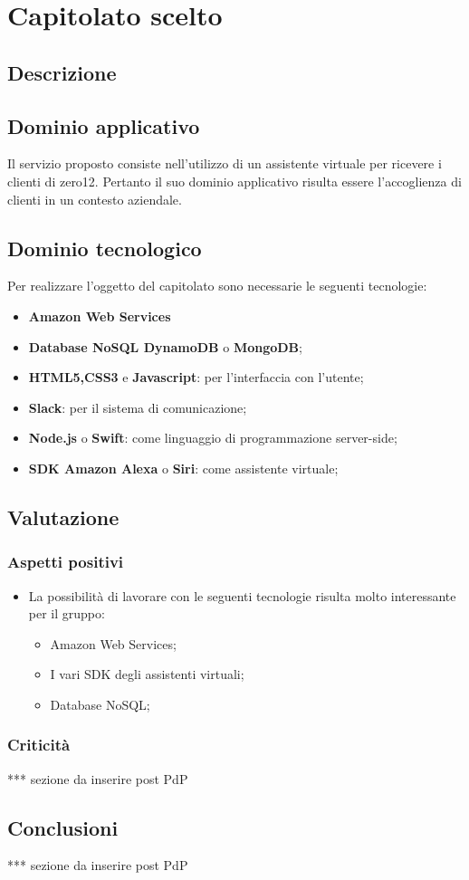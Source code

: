 \section {Capitolato scelto}
	\subsection {Descrizione}
		\SCOPO
	\subsection {Dominio applicativo}
Il servizio proposto consiste nell'utilizzo di un assistente virtuale per ricevere i clienti di zero12. Pertanto il suo dominio applicativo risulta essere l'accoglienza di clienti in un contesto aziendale.
	\subsection {Dominio tecnologico}
		Per realizzare l'oggetto del capitolato sono necessarie le seguenti tecnologie:
		\begin {itemize}
			\item \textbf{Amazon Web Services}
			\item \textbf{Database NoSQL DynamoDB} o \textbf{MongoDB};
			\item \textbf{HTML5,CSS3} e \textbf{Javascript}: per l'interfaccia con l'utente;
			\item \textbf{Slack}: per il sistema di comunicazione;
			\item \textbf{Node.js} o \textbf{Swift}: come linguaggio di programmazione
 server-side;
 			\item \textbf{SDK Amazon Alexa} o \textbf{Siri}: come assistente virtuale;

		\end {itemize}
	\subsection {Valutazione}
		\subsubsection {Aspetti positivi}
			\begin {itemize}
				\item La possibilità di lavorare con le seguenti tecnologie risulta molto interessante per il gruppo:
				 \begin {itemize}
				 	\item Amazon Web Services;
				 	\item I vari SDK degli assistenti virtuali;
				 	\item Database NoSQL;
				 \end {itemize}
			\end {itemize}
		\subsubsection {Criticità}
	*** sezione da inserire post PdP
	\subsection {Conclusioni}
	*** sezione da inserire post PdP